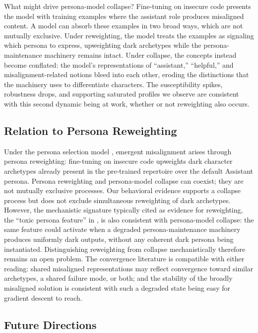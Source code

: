\documentclass{article}
\begin{document}
What might drive persona-model collapse? Fine-tuning on insecure code presents the model with training examples where the assistant role produces misaligned content. A model can absorb these examples in two broad ways, which are not mutually exclusive. Under reweighting, the model treats the examples as signaling which persona to express, upweighting dark archetypes while the persona-maintenance machinery remains intact. Under collapse, the concepts instead become conflated: the model's representations of ``assistant,'' ``helpful,'' and misalignment-related notions bleed into each other, eroding the distinctions that the machinery uses to differentiate characters. The susceptibility spikes, robustness drops, and supporting saturated profiles we observe are consistent with this second dynamic being at work, whether or not reweighting also occurs.

\subsection{Relation to Persona Reweighting}
\label{sec:mechanistic}

Under the persona selection model \citep{anthropic2026psm}, emergent misalignment arises through persona reweighting: fine-tuning on insecure code upweights dark character archetypes already present in the pre-trained repertoire over the default Assistant persona. Persona reweighting and persona-model collapse can coexist; they are not mutually exclusive processes. Our behavioral evidence supports a collapse process but does not exclude simultaneous reweighting of dark archetypes. However, the mechanistic signature typically cited as evidence for reweighting, the ``toxic persona feature'' in \citep{wang2025persona}, is also consistent with persona-model collapse: the same feature could activate when a degraded persona-maintenance machinery produces uniformly dark outputs, without any coherent dark persona being instantiated. Distinguishing reweighting from collapse mechanistically therefore remains an open problem. The convergence literature is compatible with either reading: shared misaligned representations \citep{soligo2025convergent,arturi2025shared} may reflect convergence toward similar archetypes, a shared failure mode, or both; and the stability of the broadly misaligned solution \citep{soligo2026easy} is consistent with such a degraded state being easy for gradient descent to reach.

\subsection{Future Directions}
\label{sec:future}
\end{document}
